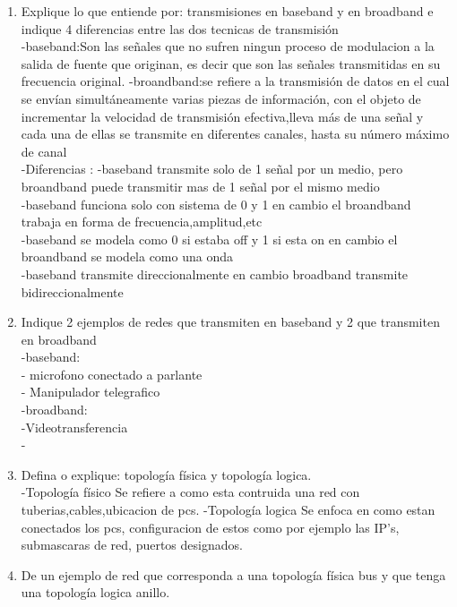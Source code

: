 \documentclass{udparticle}
\begin{document}
\begin{enumerate}
\item Explique lo que entiende por: transmisiones en baseband y en broadband e indique 4 diferencias
entre las dos tecnicas de transmisión\\
    -baseband:Son las señales que no sufren ningun proceso de modulacion a la salida de fuente que originan,
              es decir que son las señales transmitidas en su frecuencia original.
    -broandband:se refiere a la transmisión de datos en el cual se envían simultáneamente varias piezas de información, 
              con el objeto de incrementar la velocidad de transmisión efectiva,lleva más de una señal y cada una de 
              ellas se transmite en diferentes canales, hasta su número máximo de canal\\
    -Diferencias :
        -baseband transmite solo de 1 señal por un medio, pero broandband puede transmitir mas de 1 señal por el mismo medio\\
        -baseband funciona solo con sistema de 0 y 1 en cambio el broandband trabaja en forma de frecuencia,amplitud,etc\\
        -baseband se modela como 0 si estaba off y 1 si esta on en cambio el broandband se modela como una onda\\
        -baseband transmite direccionalmente en cambio broadband transmite bidireccionalmente\\

\item Indique 2 ejemplos de redes que transmiten en baseband y 2 que transmiten en broadband\\
    -baseband:\\
        - microfono conectado a parlante\\
        - Manipulador telegrafico\\
    -broadband:\\
        -Videotransferencia\\
        -\\

\item Defina o explique: topología física y topología logica. \\
    -Topología físico 
        Se refiere a como esta contruida una red con tuberias,cables,ubicacion de pcs.
    -Topología logica
        Se enfoca en como estan conectados los pcs, configuracion de estos como por ejemplo las IP's,
        submascaras de red, puertos designados.
\item De un ejemplo de red que corresponda a una topología física bus y que tenga una topología
logica anillo.\\



\end{enumerate}
\end{document}
